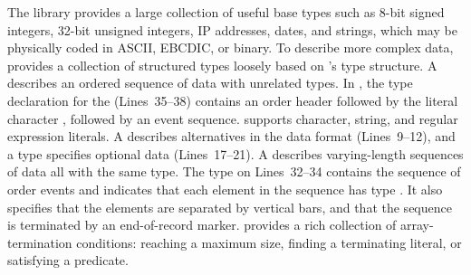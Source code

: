 The \pads{} library provides a large collection of useful
base types such as 8-bit signed integers, 32-bit unsigned integers, IP
addresses, dates, and strings, which may be
physically coded in \eg{} ASCII, EBCDIC, or binary.
To describe more complex data, \pads{} provides a collection of
structured types loosely based on \C{}'s type structure.  A
 describes an ordered sequence of data with unrelated
types.  In , the type declaration for the
  (Lines~35--38) contains an order header
followed by the literal character , followed by an event
sequence. \pads{} supports character, string, and regular expression
literals.  A  describes alternatives in the data format
(Lines~9--12), and a  type specifies optional data
(Lines~17--21).  A  describes varying-length sequences of
data all with the same type.  The type on Lines~32--34
contains the sequence of order events and indicates that each element in the
sequence has type .  It also specifies that the elements
are separated by vertical bars, and that the sequence is terminated by
an end-of-record marker.  \pads{} provides a rich collection of
array-termination conditions: reaching a maximum size, finding a
terminating literal, or satisfying a predicate. 

